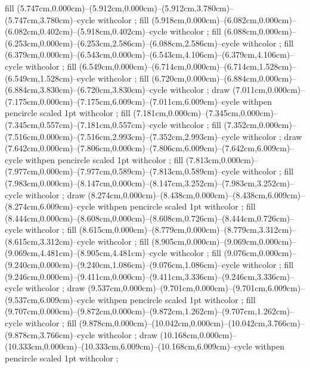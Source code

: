 {fill (5.747cm,0.000cm)--(5.912cm,0.000cm)--(5.912cm,3.780cm)--(5.747cm,3.780cm)--cycle withcolor ;
fill (5.918cm,0.000cm)--(6.082cm,0.000cm)--(6.082cm,0.402cm)--(5.918cm,0.402cm)--cycle withcolor ;
fill (6.088cm,0.000cm)--(6.253cm,0.000cm)--(6.253cm,2.586cm)--(6.088cm,2.586cm)--cycle withcolor ;
fill (6.379cm,0.000cm)--(6.543cm,0.000cm)--(6.543cm,4.106cm)--(6.379cm,4.106cm)--cycle withcolor ;
fill (6.549cm,0.000cm)--(6.714cm,0.000cm)--(6.714cm,1.528cm)--(6.549cm,1.528cm)--cycle withcolor ;
fill (6.720cm,0.000cm)--(6.884cm,0.000cm)--(6.884cm,3.830cm)--(6.720cm,3.830cm)--cycle withcolor ;
draw (7.011cm,0.000cm)--(7.175cm,0.000cm)--(7.175cm,6.009cm)--(7.011cm,6.009cm)--cycle withpen pencircle scaled 1pt withcolor ;
fill (7.181cm,0.000cm)--(7.345cm,0.000cm)--(7.345cm,0.557cm)--(7.181cm,0.557cm)--cycle withcolor ;
fill (7.352cm,0.000cm)--(7.516cm,0.000cm)--(7.516cm,2.993cm)--(7.352cm,2.993cm)--cycle withcolor ;
draw (7.642cm,0.000cm)--(7.806cm,0.000cm)--(7.806cm,6.009cm)--(7.642cm,6.009cm)--cycle withpen pencircle scaled 1pt withcolor ;
fill (7.813cm,0.000cm)--(7.977cm,0.000cm)--(7.977cm,0.589cm)--(7.813cm,0.589cm)--cycle withcolor ;
fill (7.983cm,0.000cm)--(8.147cm,0.000cm)--(8.147cm,3.252cm)--(7.983cm,3.252cm)--cycle withcolor ;
draw (8.274cm,0.000cm)--(8.438cm,0.000cm)--(8.438cm,6.009cm)--(8.274cm,6.009cm)--cycle withpen pencircle scaled 1pt withcolor ;
fill (8.444cm,0.000cm)--(8.608cm,0.000cm)--(8.608cm,0.726cm)--(8.444cm,0.726cm)--cycle withcolor ;
fill (8.615cm,0.000cm)--(8.779cm,0.000cm)--(8.779cm,3.312cm)--(8.615cm,3.312cm)--cycle withcolor ;
fill (8.905cm,0.000cm)--(9.069cm,0.000cm)--(9.069cm,4.481cm)--(8.905cm,4.481cm)--cycle withcolor ;
fill (9.076cm,0.000cm)--(9.240cm,0.000cm)--(9.240cm,1.086cm)--(9.076cm,1.086cm)--cycle withcolor ;
fill (9.246cm,0.000cm)--(9.411cm,0.000cm)--(9.411cm,3.336cm)--(9.246cm,3.336cm)--cycle withcolor ;
draw (9.537cm,0.000cm)--(9.701cm,0.000cm)--(9.701cm,6.009cm)--(9.537cm,6.009cm)--cycle withpen pencircle scaled 1pt withcolor ;
fill (9.707cm,0.000cm)--(9.872cm,0.000cm)--(9.872cm,1.262cm)--(9.707cm,1.262cm)--cycle withcolor ;
fill (9.878cm,0.000cm)--(10.042cm,0.000cm)--(10.042cm,3.766cm)--(9.878cm,3.766cm)--cycle withcolor ;
draw (10.168cm,0.000cm)--(10.333cm,0.000cm)--(10.333cm,6.009cm)--(10.168cm,6.009cm)--cycle withpen pencircle scaled 1pt withcolor ;
}
